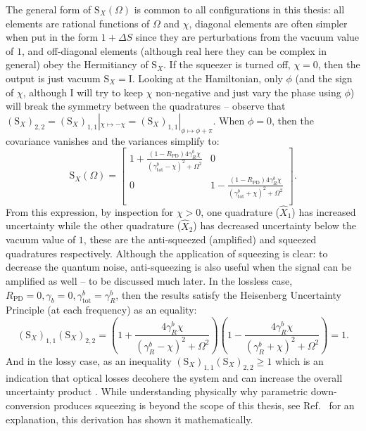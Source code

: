 The general form of $\text{S}_X(\Omega)$ is common to all configurations in this thesis: all elements are rational functions of $\Omega$ and $\chi$, diagonal elements are often simpler when put in the form $1 + \Delta S$ since they are perturbations from the vacuum value of $1$, and off-diagonal elements (although real here they can be complex in general) obey the Hermitiancy of $\text{S}_X$. If the squeezer is turned off, $\chi=0$, then the output is just vacuum $\text{S}_X=\text{I}$. Looking at the Hamiltonian, only $\phi$ (and the sign of $\chi$, although I will try to keep $\chi$ non-negative and just vary the phase using $\phi$) will break the symmetry between the quadratures  -- observe that $(\text{S}_X)_{2,2}=(\text{S}_X)_{1,1}|_{\chi\mapsto-\chi}=(\text{S}_X)_{1,1}|_{\phi\mapsto\phi+\pi}$. When $\phi=0$, then the covariance vanishes and the variances simplify to: $$ \label{eq:dOPO_fixed_phase}
\text{S}_X(\Omega)=\left[
\begin{array}{cc}
 1+\frac{(1-R_\text{PD})4 \gamma^b_R \chi}{\left({\gamma^b_\text{tot}}-\chi\right)^2+\Omega ^2}
 & 0 \\
 0
 & 1-\frac{(1-R_\text{PD})4 \gamma^b_R \chi}{\left({\gamma^b_\text{tot}}+\chi\right)^2+\Omega ^2} \\
\end{array}
\right].$$ From this expression, by inspection for $\chi>0$, one quadrature ($\hat X_1$) has increased uncertainty while the other quadrature ($\hat X_2$) has decreased uncertainty below the vacuum value of $1$, these are the anti-squeezed (amplified) and squeezed quadratures respectively. Although the application of squeezing is clear: to decrease the quantum noise, anti-squeezing is also useful when the signal can be amplified as well -- to be discussed much later. In the lossless case, $R_\text{PD}=0, \gamma_b=0, \gamma^b_\text{tot}=\gamma^b_R$, then the results satisfy the Heisenberg Uncertainty Principle (at each frequency) as an equality: $$\label{eq:dOPO_HUP_sat}(\text{S}_X)_{1,1}(\text{S}_X)_{2,2}=\left(1+\frac{4 \gamma^b_R \chi}{\left(\gamma^b_R-\chi\right)^2+\Omega ^2}\right)\left(1-\frac{4 \gamma^b_R \chi}{\left(\gamma^b_R+\chi\right)^2+\Omega ^2}\right)=1.$$ And in the lossy case, as an inequality $(\text{S}_X)_{1,1}(\text{S}_X)_{2,2}\geq1$  which is an indication that optical losses decohere the system and can increase the overall uncertainty product . While understanding physically why parametric down-conversion produces squeezing is beyond the scope of this thesis, see Ref.~\cite{} for an explanation, this derivation has shown it mathematically.

